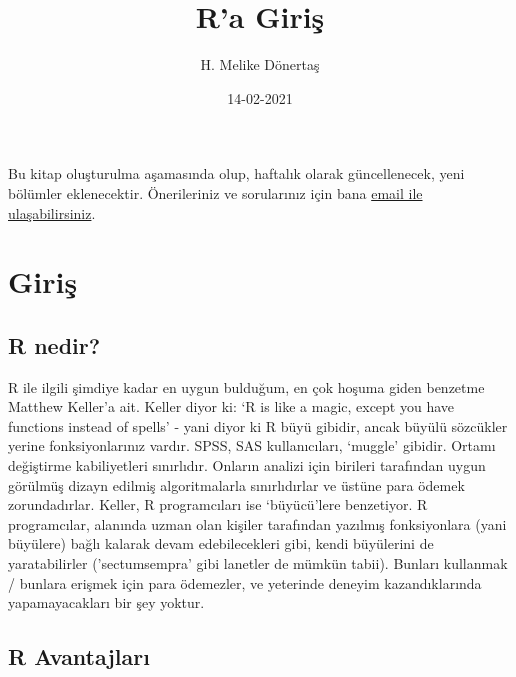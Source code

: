 \documentclass[
]{book}
\title{R'a Giriş}
\author{H. Melike Dönertaş}
\date{14-02-2021}
\begin{document}
\maketitle

{
\setcounter{tocdepth}{1}
\tableofcontents
}
\hypertarget{section}{%
\chapter*{}\label{section}}

Bu kitap oluşturulma aşamasında olup, haftalık olarak güncellenecek, yeni bölümler eklenecektir. Önerileriniz ve sorularınız için bana \href{mailto:donertas.melike@gmail.com}{email ile ulaşabilirsiniz}.

\hypertarget{Giris}{%
\chapter{Giriş}\label{Giris}}

\hypertarget{r-nedir}{%
\section{R nedir?}\label{r-nedir}}

R ile ilgili şimdiye kadar en uygun bulduğum, en çok hoşuma giden benzetme Matthew Keller'a ait. Keller diyor ki: `R is like a magic, except you have functions instead of spells' - yani diyor ki R büyü gibidir, ancak büyülü sözcükler yerine fonksiyonlarınız vardır. SPSS, SAS kullanıcıları, `muggle' gibidir. Ortamı değiştirme kabiliyetleri sınırlıdır. Onların analizi için birileri tarafından uygun görülmüş dizayn edilmiş algoritmalarla sınırlıdırlar ve üstüne para ödemek zorundadırlar. Keller, R programcıları ise `büyücü'lere benzetiyor. R programcılar, alanında uzman olan kişiler tarafından yazılmış fonksiyonlara (yani büyülere) bağlı kalarak devam edebilecekleri gibi, kendi büyülerini de yaratabilirler ('sectumsempra' gibi lanetler de mümkün tabii). Bunları kullanmak / bunlara erişmek için para ödemezler, ve yeterinde deneyim kazandıklarında yapamayacakları bir şey yoktur.

\hypertarget{r-avantajlarux131}{%
\section{R Avantajları}\label{r-avantajlarux131}}
\end{document}
